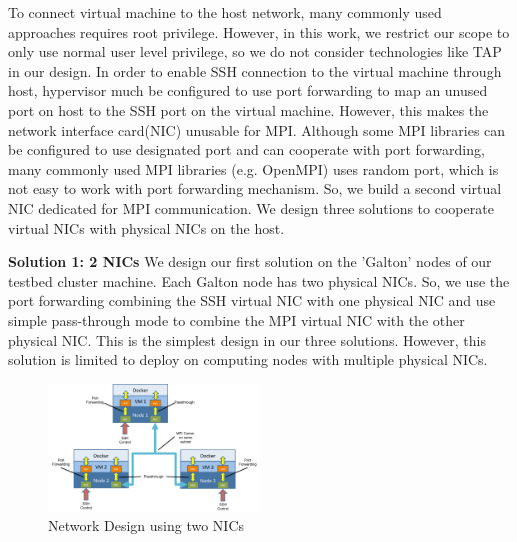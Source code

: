 To connect virtual machine to the host network, many commonly used approaches requires root privilege. However, in this work, we restrict our scope to only use normal user level privilege, so we do not consider technologies like TAP in our design. In order to enable SSH connection to the virtual machine through host, hypervisor much be configured to use port forwarding to map an unused port on host to the SSH port on the virtual machine. However, this makes the network interface card(NIC) unusable for MPI. Although some MPI libraries can be configured to use designated port and can cooperate with port forwarding, many commonly used MPI libraries (e.g. OpenMPI) uses random port, which is not easy to work with port forwarding mechanism. So, we build a second virtual NIC dedicated for MPI communication. We design three solutions to cooperate virtual NICs with physical NICs on the host. 

\textbf{Solution 1: 2 NICs}
We design our first solution on the 'Galton' nodes of our testbed cluster machine. Each Galton node has two physical NICs. So, we use the port forwarding combining the SSH virtual NIC with one physical NIC and use simple pass-through mode to combine the MPI virtual NIC with the other physical NIC. This is the simplest design in our three solutions. However, this solution is limited to deploy on computing nodes with multiple physical NICs. 
\begin{figure}[h]
    \centering
    \caption{Network Design using two NICs}
    \label{2nic}
    \includegraphics[width=0.5\textwidth]{figures/2nic.pdf}
\end{figure}
 
